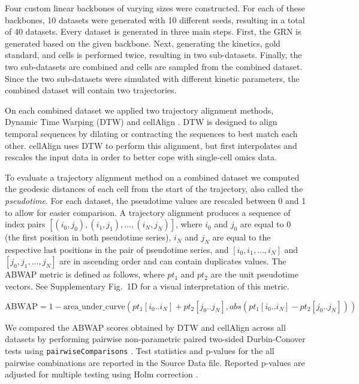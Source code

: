 \documentclass[
  table,
  10pt,
  a4paper]{article}
\begin{document}
Four custom linear backbones of varying sizes were constructed. For each
of these backbones, 10 datasets were generated with 10 different seeds,
resulting in a total of 40 datasets. Every dataset is generated in three
main steps. First, the GRN is generated based on the given backbone.
Next, generating the kinetics, gold standard, and cells is performed
twice, resulting in two sub-datasets. Finally, the two sub-datasets are
combined and cells are sampled from the combined dataset. Since the two
sub-datasets were simulated with different kinetic parameters, the
combined dataset will contain two trajectories.

On each combined dataset we applied two trajectory alignment methods,
Dynamic Time Warping (DTW)
\autocite{giorgino_computingvisualizingdynamic_2009} and cellAlign
\autocite{alpert_alignmentsinglecelltrajectories_2018}. DTW is designed
to align temporal sequences by dilating or contracting the sequences to
best match each other. cellAlign uses DTW to perform this alignment, but
first interpolates and rescales the input data in order to better cope
with single-cell omics data.

To evaluate a trajectory alignment method on a combined dataset we
computed the geodesic distances of each cell from the start of the
trajectory, also called the \emph{pseudotime}. For each dataset, the
pseudotime values are rescaled between 0 and 1 to allow for easier
comparison. A trajectory alignment produces a sequence of index pairs
\([(i_0, j_0), (i_1, j_1), \ldots, (i_N, j_N)]\), where \(i_0\) and
\(j_0\) are equal to 0 (the first position in both pseudotime series),
\(i_N\) and \(j_N\) are equal to the respective last positions in the
pair of pseudotime series, and \([i_0, i_1, \ldots, i_N]\) and
\([j_0, j_1, \ldots, j_N]\) are in ascending order and can contain
duplicates values. The ABWAP metric is defined as follows, where
\(pt_1\) and \(pt_2\) are the unit pseudotime vectors. See Supplementary
Fig.~1D for a visual interpretation of this metric.

\begin{equation}
  \textrm{ABWAP} = 1 - \textrm{area\_under\_curve}(pt_1[i_0 .. i_N] + pt_2[j_0 .. j_N], abs(pt_1[i_0 .. i_N] - pt_2[j_0 .. j_N]))
\end{equation}

We compared the ABWAP scores obtained by DTW and cellAlign across all
datasets by performing pairwise non-parametric paired two-sided
Durbin-Conover tests
\autocite{conover_multiplecomparisonsprocedures_1979} using
\texttt{pairwiseComparisons}
\autocite{patil_pairwisecomparisonsmultiplepairwise_2019}. Test
statistics and p-values for the all pairwise combinations are reported
in the Source Data file. Reported p-values are adjusted for multiple
testing using Holm correction
\autocite{holm_simplesequentiallyrejective_1979}.
\end{document}

